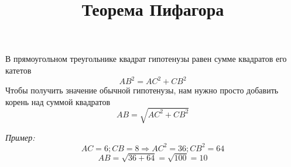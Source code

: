 \documentclass[12pt]{article}
\date{}
\title{Теорема Пифагора}
\begin{document}
\maketitle
В прямоугольном треугольнике квадрат гипотенузы равен сумме квадратов его катетов
\[ AB^2 = AC^2 + CB^2 \]
Чтобы получить значение обычной гипотенузы, нам нужно просто добавить корень над суммой квадратов
\[ AB = \sqrt{AC^2 + CB^2} \]

\textit{Пример:}
\[AC = 6; CB = 8 \Rightarrow AC^2 = 36; CB^2 = 64 \] 
\[AB = \sqrt{36 + 64} = \sqrt{100} = 10 \]
\end{document}
